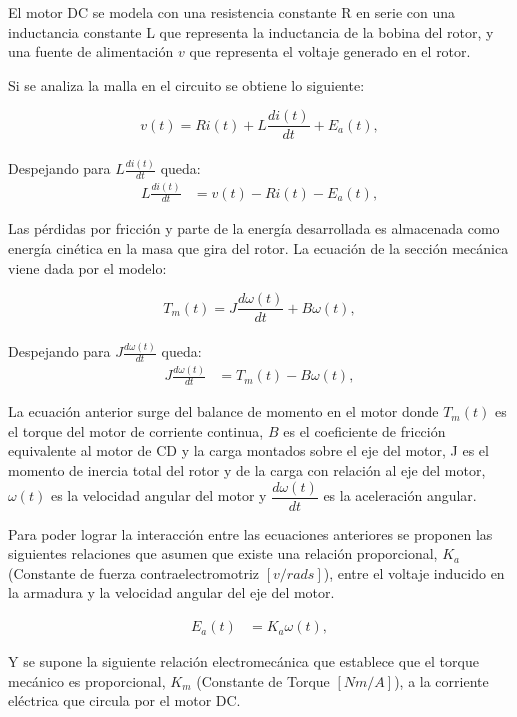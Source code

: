 \documentclass[journal]{IEEEtran}
\begin{document}
El motor DC se modela con una resistencia constante R en serie con una inductancia constante L que representa la inductancia de la bobina del rotor, y una fuente de alimentación $v$ que representa el voltaje generado en el rotor.

Si se analiza la malla en el circuito se obtiene lo siguiente:

\begin{equation*}
    v(t)= Ri(t) + L\frac{di(t)}{dt}+E_a (t), 
\end{equation*}
\\
Despejando para $L\frac{di(t)}{dt}$ queda:
\begin{align}
 L\frac{di(t)}{dt} &= v(t)-Ri(t) - E_a (t), 
\end{align}

Las pérdidas por fricción y parte de la energía desarrollada es almacenada como energía cinética en la masa que gira del rotor. La ecuación de la sección mecánica viene dada por el modelo:

\begin{equation*}
    T_m(t) = J\frac{d\omega(t)}{dt}+B\omega(t), 
\end{equation*}
\\
Despejando para $J\frac{d\omega(t)}{dt}$ queda:
\begin{align}
 J\frac{d\omega(t)}{dt} &= T_m(t)-B\omega(t), 
\end{align}

La ecuación anterior surge del balance de momento en el motor donde $T_m(t)$ es el torque del motor de corriente continua, $B$ es el coeficiente de fricción equivalente al motor de CD y la carga montados sobre el eje del motor, J es el momento de inercia total del rotor y de la carga con relación al eje del motor, $\omega(t)$ es la velocidad angular del motor y $\dfrac{d\omega(t)}{dt}$ es la aceleración angular.

Para poder lograr la interacción entre las ecuaciones anteriores se proponen las siguientes relaciones que asumen que existe una relación proporcional, $K_a$ (Constante de fuerza contraelectromotriz $[v/rad s]$), entre el voltaje inducido en la armadura y la velocidad angular del eje del motor.

\begin{align}
E_a(t) &= K_a\omega(t),
\end{align}

Y se supone la siguiente relación electromecánica que establece que el torque mecánico es proporcional, $K_m$ (Constante de Torque $[Nm / A]$), a la corriente eléctrica que circula por el motor DC.
\end{document}
